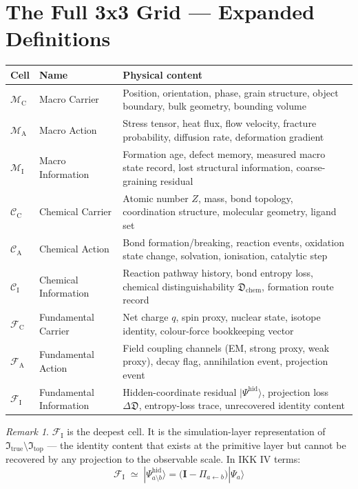 \documentclass[11pt, a4paper, oneside]{article}
\theoremstyle{definition}
\theoremstyle{plain}
\theoremstyle{remark}
\newtheorem{remark}{Remark}[section]
\newcommand{\Macro}{\mathscr{M}}          %
\newcommand{\Chem}{\mathscr{C}}           %
\newcommand{\Fund}{\mathscr{F}}           %
\newcommand{\MC}{\Macro_{\mathrm{C}}}
\newcommand{\MA}{\Macro_{\mathrm{A}}}
\newcommand{\MI}{\Macro_{\mathrm{I}}}
\newcommand{\CC}{\Chem_{\mathrm{C}}}
\newcommand{\CA}{\Chem_{\mathrm{A}}}
\newcommand{\CI}{\Chem_{\mathrm{I}}}
\newcommand{\FC}{\Fund_{\mathrm{C}}}
\newcommand{\FA}{\Fund_{\mathrm{A}}}
\newcommand{\FI}{\Fund_{\mathrm{I}}}
\newcommand{\Dfrak}{\mathfrak{D}}
\newcommand{\Psihid}{|\Psi^{\mathrm{hid}}\rangle}
\begin{document}
\section{The Full 3x3 Grid --- Expanded Definitions}

\begin{longtable}{p{2.5cm} p{3.5cm} p{7cm}}
  \toprule
  \textbf{Cell} & \textbf{Name} & \textbf{Physical content} \\
  \midrule
  \rowcolor{MacroBG}
  $\MC$ & Macro Carrier &
  Position, orientation, phase, grain structure, object boundary,
  bulk geometry, bounding volume \\[3pt]
  \rowcolor{MacroBG}
  $\MA$ & Macro Action &
  Stress tensor, heat flux, flow velocity, fracture probability,
  diffusion rate, deformation gradient \\[3pt]
  \rowcolor{MacroBG}
  $\MI$ & Macro Information &
  Formation age, defect memory, measured macro state record,
  lost structural information, coarse-graining residual \\[6pt]
  \rowcolor{ChemBG}
  $\CC$ & Chemical Carrier &
  Atomic number $Z$, mass, bond topology, coordination structure,
  molecular geometry, ligand set \\[3pt]
  \rowcolor{ChemBG}
  $\CA$ & Chemical Action &
  Bond formation/breaking, reaction events, oxidation state change,
  solvation, ionisation, catalytic step \\[3pt]
  \rowcolor{ChemBG}
  $\CI$ & Chemical Information &
  Reaction pathway history, bond entropy loss, chemical distinguishability
  $\Dfrak_{\mathrm{chem}}$, formation route record \\[6pt]
  \rowcolor{FundBG}
  $\FC$ & Fundamental Carrier &
  Net charge $q$, spin proxy, nuclear state, isotope identity,
  colour-force bookkeeping vector \\[3pt]
  \rowcolor{FundBG}
  $\FA$ & Fundamental Action &
  Field coupling channels (EM, strong proxy, weak proxy), decay flag,
  annihilation event, projection event \\[3pt]
  \rowcolor{FundBG}
  $\FI$ & Fundamental Information &
  Hidden-coordinate residual $\Psihid$, projection loss $\Delta\Dfrak$,
  entropy-loss trace, unrecovered identity content \\
  \bottomrule
\end{longtable}

\begin{remark}
  $\FI$ is the deepest cell. It is the simulation-layer representation of
  $\mathfrak{I}_{\mathrm{true}} \setminus \mathfrak{I}_{\mathrm{top}}$ ---
  the identity content that exists at the primitive layer but cannot be
  recovered by any projection to the observable scale. In IKK IV terms:
  \[
    \FI \;\simeq\; |\Psi^{\mathrm{hid}}_{a\setminus b}\rangle
    = \bigl(\mathbf{I} - \Pi_{a\leftarrow b}\bigr)|\Psi_a\rangle
  \]
\end{remark}
\end{document}
